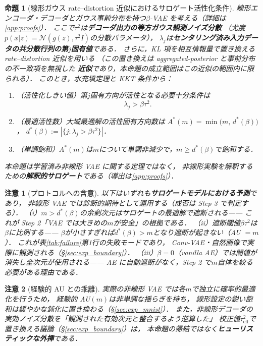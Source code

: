\documentclass[11pt,a4paper]{jsarticle}
\newtheorem{proposition}{命題}
\newtheorem{remark}{注意}
\newcommand{\dstar}{d^{*}(\beta)}
\begin{document}
\begin{proposition}[線形ガウス rate--distortion 近似におけるサロゲート活性化条件]\label{thm:linear_vae}
線形エンコーダ・デコーダとガウス事前分布を持つ$\beta$-VAE を考える（詳細は\ref{app:proofs}）．
ここで$\tau^2$は\textbf{デコーダ出力の等方ガウス観測ノイズ分散}
（尤度$p(x|z) = \mathcal{N}(g(z), \tau^2 I)$の分散パラメータ），
$\lambda_j$は\textbf{センタリング済み入力データの共分散行列の第$j$固有値}である．
さらに，KL 項を相互情報量で置き換える rate--distortion 近似を用いる
（この置き換えは aggregated-posterior と事前分布の不一致項を無視した
\textbf{近似}であり，本命題の成立範囲はこの近似の範囲内に限られる）．
このとき，水充填定理と KKT 条件から：
\begin{enumerate}
  \item （活性化しきい値）第$j$固有方向が活性となる必要十分条件は
        \begin{equation}
          \lambda_j > \beta \tau^2 .
          \label{eq:au_threshold}
        \end{equation}
  \item （最適活性数）大域最適解の活性固有方向数は
        $A^*(m) = \min\bigl(m,\, \dstar\bigr)$，
        $\dstar := |\{j : \lambda_j > \beta\tau^2\}|$．
  \item （単調飽和）$A^*(m)$は$m$について単調非減少で，$m \geq \dstar$で飽和する．
\end{enumerate}
本命題は学習済み非線形 VAE に関する定理ではなく，
非線形実験を解釈するための\textbf{解釈的サロゲート}である（導出は\ref{app:proofs}）．
\end{proposition}

\begin{remark}[プロトコルへの含意]\label{rem:implication}
以下はいずれも\textbf{サロゲートモデルにおける予測}であり，
非線形 VAE では診断的期待として運用する（成否は Step 3 で判定する）．
（i）$m > \dstar$の余剰次元はサロゲートの最適解で遮断される——
これが Step 2「VAE では大きめの$m$が安全」の根拠である．
（ii）遮断閾値$\beta\tau^2$は$\beta$に比例する——
$\beta$が小さすぎれば$\dstar > m$となり遮断が起きない（AU $= m$）．
これが表\ref{tab:failure}第1行の失敗モードであり，
Conv-VAE・自然画像で実際に観測される（§\ref{sec:exp_boundary}）．
（iii）$\beta = 0$（vanilla AE）では閾値が消失し全次元が使用される——
AE に自動遮断がなく，Step 2 で$m$自体を絞る必要がある理由である．
\end{remark}

\begin{remark}[経験的 AU との乖離]
実際の非線形 VAE では各$m$で独立に確率的最適化を行うため，
経験的 AU$(m)$は非単調な揺らぎを持ち，
線形設定の鋭い飽和は緩やかな鈍化に置き換わる（§\ref{sec:exp_mnist}）．
また，非線形デコーダの実効ノイズ分散を「観測された有効次元と整合するよう逆算した」
校正値$\tau^2_{\mathrm{eff}}$で置き換える議論（§\ref{sec:exp_boundary}）は，
本命題の帰結ではなく\textbf{ヒューリスティックな外挿}である．
\end{remark}
\end{document}
